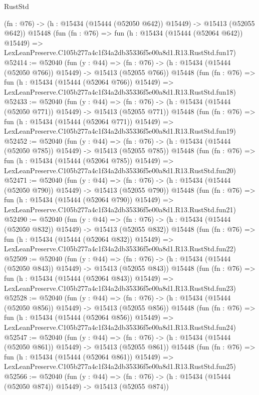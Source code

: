 \begin{lexlean}{RustStd}
\begin{coremodule}
    (fn : @76) -> (h : @15434 (@15444 (@52050 @642)) @15449) -> @15413 (@52055 @642))
    @15448
    (fun (fn : @76) =>
    fun (h : @15434 (@15444 (@52064 @642)) @15449) =>
    LexLeanPreserve.C105b277a4c1f34a2db35336f5e00a8d1.R13.RustStd.fun17)
@52414 := @52040
    (fun (y : @44) =>
    (fn : @76) -> (h : @15434 (@15444 (@52050 @766)) @15449) -> @15413 (@52055 @766))
    @15448
    (fun (fn : @76) =>
    fun (h : @15434 (@15444 (@52064 @766)) @15449) =>
    LexLeanPreserve.C105b277a4c1f34a2db35336f5e00a8d1.R13.RustStd.fun18)
@52433 := @52040
    (fun (y : @44) =>
    (fn : @76) -> (h : @15434 (@15444 (@52050 @771)) @15449) -> @15413 (@52055 @771))
    @15448
    (fun (fn : @76) =>
    fun (h : @15434 (@15444 (@52064 @771)) @15449) =>
    LexLeanPreserve.C105b277a4c1f34a2db35336f5e00a8d1.R13.RustStd.fun19)
@52452 := @52040
    (fun (y : @44) =>
    (fn : @76) -> (h : @15434 (@15444 (@52050 @785)) @15449) -> @15413 (@52055 @785))
    @15448
    (fun (fn : @76) =>
    fun (h : @15434 (@15444 (@52064 @785)) @15449) =>
    LexLeanPreserve.C105b277a4c1f34a2db35336f5e00a8d1.R13.RustStd.fun20)
@52471 := @52040
    (fun (y : @44) =>
    (fn : @76) -> (h : @15434 (@15444 (@52050 @790)) @15449) -> @15413 (@52055 @790))
    @15448
    (fun (fn : @76) =>
    fun (h : @15434 (@15444 (@52064 @790)) @15449) =>
    LexLeanPreserve.C105b277a4c1f34a2db35336f5e00a8d1.R13.RustStd.fun21)
@52490 := @52040
    (fun (y : @44) =>
    (fn : @76) -> (h : @15434 (@15444 (@52050 @832)) @15449) -> @15413 (@52055 @832))
    @15448
    (fun (fn : @76) =>
    fun (h : @15434 (@15444 (@52064 @832)) @15449) =>
    LexLeanPreserve.C105b277a4c1f34a2db35336f5e00a8d1.R13.RustStd.fun22)
@52509 := @52040
    (fun (y : @44) =>
    (fn : @76) -> (h : @15434 (@15444 (@52050 @843)) @15449) -> @15413 (@52055 @843))
    @15448
    (fun (fn : @76) =>
    fun (h : @15434 (@15444 (@52064 @843)) @15449) =>
    LexLeanPreserve.C105b277a4c1f34a2db35336f5e00a8d1.R13.RustStd.fun23)
@52528 := @52040
    (fun (y : @44) =>
    (fn : @76) -> (h : @15434 (@15444 (@52050 @856)) @15449) -> @15413 (@52055 @856))
    @15448
    (fun (fn : @76) =>
    fun (h : @15434 (@15444 (@52064 @856)) @15449) =>
    LexLeanPreserve.C105b277a4c1f34a2db35336f5e00a8d1.R13.RustStd.fun24)
@52547 := @52040
    (fun (y : @44) =>
    (fn : @76) -> (h : @15434 (@15444 (@52050 @861)) @15449) -> @15413 (@52055 @861))
    @15448
    (fun (fn : @76) =>
    fun (h : @15434 (@15444 (@52064 @861)) @15449) =>
    LexLeanPreserve.C105b277a4c1f34a2db35336f5e00a8d1.R13.RustStd.fun25)
@52566 := @52040
    (fun (y : @44) =>
    (fn : @76) -> (h : @15434 (@15444 (@52050 @874)) @15449) -> @15413 (@52055 @874))

\end{coremodule}
\end{lexlean}
